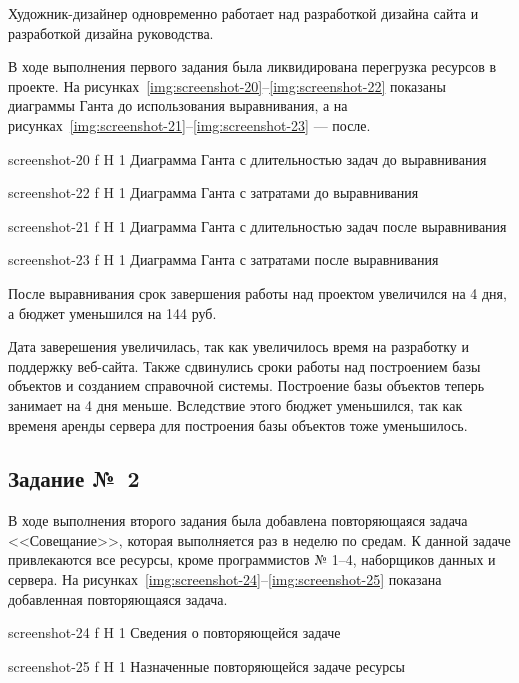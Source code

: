 \documentclass{bmstu}
\begin{document}
Художник-дизайнер одновременно работает над разработкой дизайна сайта и разработкой дизайна руководства.

В ходе выполнения первого задания была ликвидирована перегрузка ресурсов в проекте. 
На рисунках~\ref{img:screenshot-20}--\ref{img:screenshot-22} показаны диаграммы Ганта до использования выравнивания, а на рисунках~\ref{img:screenshot-21}--\ref{img:screenshot-23} --- после.
    
    {screenshot-20}
    {f}
    {H}
    {1\textwidth}
    {Диаграмма Ганта с длительностью задач до выравнивания}
    
    {screenshot-22}
    {f}
    {H}
    {1\textwidth}
    {Диаграмма Ганта с затратами до выравнивания}
    
    {screenshot-21}
    {f}
    {H}
    {1\textwidth}
    {Диаграмма Ганта с длительностью задач после выравнивания}
    
    {screenshot-23}
    {f}
    {H}
    {1\textwidth}
    {Диаграмма Ганта с затратами после выравнивания}
    
После выравнивания срок завершения работы над проектом увеличился на 4 дня, а бюджет уменьшился на 144 руб.

Дата заверешения увеличилась, так как увеличилось время на разработку и поддержку веб-сайта. 
Также сдвинулись сроки работы над построением базы объектов и созданием справочной системы. 
Построение базы объектов теперь занимает на 4 дня меньше. 
Вследствие этого бюджет уменьшился, так как временя аренды сервера для построения базы объектов тоже уменьшилось.

\subsection{Задание №~2}

В ходе выполнения второго задания была добавлена повторяющаяся задача <<Совещание>>, которая выполняется раз в неделю по средам. 
К данной задаче привлекаются все ресурсы, кроме программистов № 1--4, наборщиков данных и сервера. 
На рисунках~\ref{img:screenshot-24}--\ref{img:screenshot-25} показана добавленная повторяющаяся задача.
    
    {screenshot-24}
    {f}
    {H}
    {1\textwidth}
    {Сведения о повторяющейся задаче}
    
    {screenshot-25}
    {f}
    {H}
    {1\textwidth}
    {Назначенные повторяющейся задаче ресурсы}
    
\end{document}
